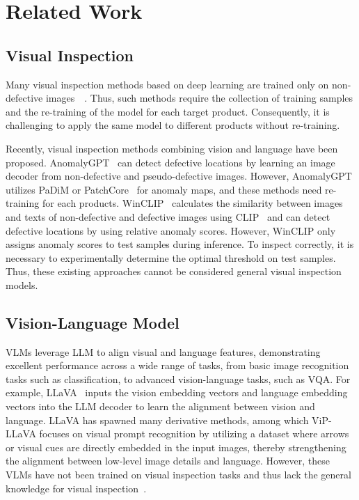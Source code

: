 \section{Related Work}
\label{sec:relatedwork}

\subsection{Visual Inspection}
\label{sec:vi}
Many visual inspection methods based on deep learning are trained only on non-defective images~\cite{PatchSVDDPatchlevelSVDDAnomalyDetectionSegmentation}~\cite{Padimpatchdistributionmodelingframeworkanomalydetectionlocalization}.
% 
Thus, such methods require the collection of training samples and the re-training of the model for each target product. 
% 
Consequently, it is challenging to apply the same model to different products without re-training.

Recently, visual inspection methods combining vision and language have been proposed.
% 
AnomalyGPT~\cite{AnomalyGPTDetectingIndustrialAnomaliesUsingLargeVisionLanguageModelsa} can detect defective locations by learning an image decoder from non-defective and pseudo-defective images. 
However, AnomalyGPT utilizes PaDiM or PatchCore~\cite{totalrecallindustrialanomalydetection} for anomaly maps, and these methods need re-training for each products.
% 
WinCLIP~\cite{WinCLIPZeroFewShotAnomalyClassificationSegmentation} calculates the similarity between images and texts of non-defective and defective images using CLIP~\cite{LearningTransferableVisualModelsNaturalLanguageSupervisiona} and can detect defective locations by using relative anomaly scores.
% 
However, WinCLIP only assigns anomaly scores to test samples during inference. 
To inspect correctly, it is necessary to experimentally determine the optimal threshold on test samples.
Thus, these existing approaches cannot be considered general visual inspection models.



\subsection{Vision-Language Model}
\label{sec:VLM}
VLMs leverage LLM to align visual and language features, demonstrating excellent performance across a wide range of tasks, from basic image recognition tasks such as classification, to advanced vision-language tasks, such as VQA. 
% 
For example, LLaVA~\cite{VisualInstructionTuning} inputs the vision embedding vectors and language embedding vectors into the LLM decoder to learn the alignment between vision and language.
% 
LLaVA has spawned many derivative methods, among which ViP-LLaVA focuses on visual prompt recognition by utilizing a dataset where arrows or visual cues are directly embedded in the input images, thereby strengthening the alignment between low-level image details and language. 
% 
However, these VLMs have not been trained on visual inspection tasks and thus lack the general knowledge for visual inspection~\cite{MMBenchYourMultimodalModelAllaroundPlayer}.


